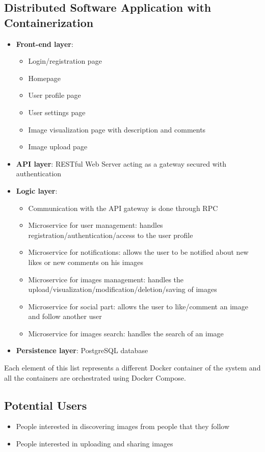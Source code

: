 \documentclass[11pt, a4paper]{article}
\begin{document}
\subsection{Distributed Software Application with Containerization}
\begin{itemize}
    \item \textbf{Front-end layer}:
    \begin{itemize}
     \item Login/registration page
     \item Homepage
     \item User profile page
     \item User settings page
     \item Image visualization page with description and comments
     \item Image upload page
    \end{itemize}
    \item \textbf{API layer}: RESTful Web Server acting as a gateway secured with authentication    
    \item \textbf{Logic layer}: 
    \begin{itemize}
     \item Communication with the API gateway is done through RPC
     \item Microservice for user management: handles registration/authentication/access to the user profile
     \item Microservice for notifications: allows the user to be notified about new likes or new comments on his images
     \item Microservice for images management: handles the upload/visualization/modification/deletion/saving of images
     \item Microservice for social part: allows the user to like/comment an image and follow another user
     \item Microservice for images search: handles the search of an image
    \end{itemize}
    \item \textbf{Persistence layer}: PostgreSQL database
\end{itemize}
Each element of this list represents a different Docker container of the system and all the containers are orchestrated using Docker Compose.

\subsection{Potential Users}
\begin{itemize}
    \item People interested in discovering images from people that they follow
    \item People interested in uploading and sharing images
\end{itemize}
\end{document}
